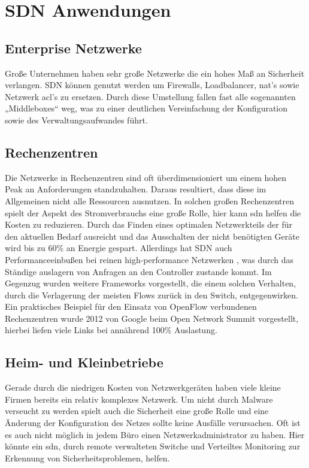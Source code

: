 \documentclass[twoside,12pt]{scrartcl}
\begin{document}
\section{SDN Anwendungen}
	\subsection{Enterprise Netzwerke}
	Große Unternehmen haben sehr große Netzwerke die ein hohes Maß an Sicherheit verlangen. SDN können genutzt werden um Firewalls, Loadbalancer, \gls{nat}'s sowie Netzwerk \gls{acl}'s zu ersetzen. Durch diese Umstellung fallen fast alle sogenannten „Middleboxes“ weg, was zu einer deutlichen Vereinfachung der Konfiguration sowie des Verwaltungsaufwandes führt.
	\subsection{Rechenzentren}
	Die Netzwerke in Rechenzentren sind oft überdimensioniert um einem hohen Peak an Anforderungen standzuhalten. Daraus resultiert, dass diese im Allgemeinen nicht alle Ressourcen ausnutzen. In solchen großen Rechenzentren spielt der Aspekt des Stromverbrauchs eine große Rolle, hier kann \gls{sdn} helfen die Kosten zu reduzieren. Durch das Finden eines optimalen Netzwerkteils der für den aktuellen Bedarf ausreicht und das Ausschalten der nicht benötigten Geräte wird bis zu 60\% an Energie gespart. Allerdings hat SDN auch Performanceeinbußen bei reinen high-performance Netzwerken \cite{6730793}, was durch das Ständige auslagern von Anfragen an den Controller zustande kommt. Im Gegenzug wurden weitere Frameworks vorgestellt, die einem solchen Verhalten, durch die Verlagerung der meisten Flows zurück in den Switch, entgegenwirken. Ein praktisches Beispiel für den Einsatz von OpenFlow verbundenen Rechenzentren wurde 2012 von Google beim Open Network Summit vorgestellt, hierbei liefen viele Links bei annährend 100\% Auslastung.
	\subsection{Heim- und Kleinbetriebe}
	Gerade durch die niedrigen Kosten von Netzwerkgeräten haben viele kleine Firmen bereits ein relativ komplexes Netzwerk. Um nicht durch Malware verseucht zu werden spielt auch die Sicherheit eine große Rolle und eine Änderung der Konfiguration des Netzes sollte keine Ausfälle verursachen. Oft ist es auch nicht möglich in jedem Büro einen Netzwerkadministrator zu haben. Hier könnte ein \gls{sdn}, durch remote verwalteten Switche und Verteiltes Monitoring zur Erkennung von Sicherheitsproblemen, helfen.
\end{document}
